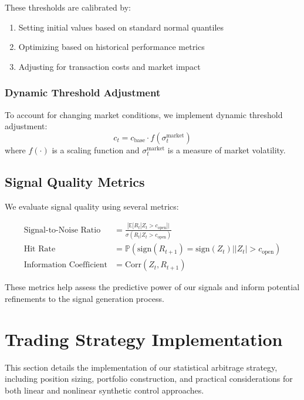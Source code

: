 These thresholds are calibrated by:
\begin{enumerate}
    \item Setting initial values based on standard normal quantiles
    \item Optimizing based on historical performance metrics
    \item Adjusting for transaction costs and market impact
\end{enumerate}

\subsubsection{Dynamic Threshold Adjustment}
To account for changing market conditions, we implement dynamic threshold adjustment:
\begin{equation}
    c_t = c_{\text{base}} \cdot f(\sigma_t^{\text{market}})
\end{equation}
where $f(\cdot)$ is a scaling function and $\sigma_t^{\text{market}}$ is a measure of market volatility.

\subsection{Signal Quality Metrics}

We evaluate signal quality using several metrics:

\begin{equation}
\begin{aligned}
    \text{Signal-to-Noise Ratio} &= \frac{|\mathbb{E}[R_t | Z_t > c_{\text{open}}]|}{\sigma(R_t | Z_t > c_{\text{open}})} \\
    \text{Hit Rate} &= \mathbb{P}(\text{sign}(R_{t+1}) = \text{sign}(Z_t) | |Z_t| > c_{\text{open}}) \\
    \text{Information Coefficient} &= \text{Corr}(Z_t, R_{t+1})
\end{aligned}
\end{equation}

These metrics help assess the predictive power of our signals and inform potential refinements to the signal generation process.


\section{Trading Strategy Implementation}

This section details the implementation of our statistical arbitrage strategy, including position sizing, portfolio construction, and practical considerations for both linear and nonlinear synthetic control approaches.

